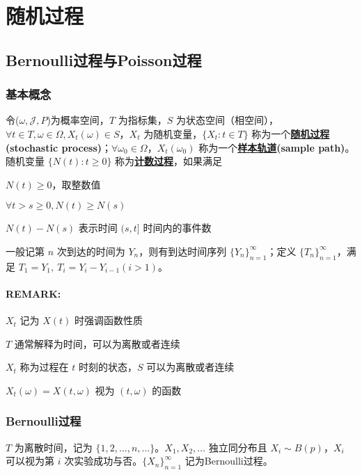 \documentclass[./main.tex]{subfiles}
\begin{document}
\chapter{随机过程}
\section{Bernoulli过程与Poisson过程}
\subsection{基本概念}
令($\omega,\mathscr{J},P$)为概率空间，$T$ 为指标集，$S$ 为状态空间（相空间），$\forall t\in T, \omega\in\Omega,X_t(\omega)\in S$，$X_t$ 为随机变量，$\{X_t:t\in T\}$ 称为一个\underline{\textbf{随机过程}}\textbf{(stochastic process)}；$\forall \omega_0\in\Omega$，$X_t(\omega_0)$ 称为一个\underline{\textbf{样本轨道}}\textbf{(sample path)}。\\
随机变量 $\{N(t):t\ge 0\}$ 称为\underline{\textbf{计数过程}}，如果满足
\begin{enumerate*}
    \item $N(t)\ge 0$，取整数值
    \item $\forall t>s\ge 0,N(t)\ge N(s)$
    \item $N(t)-N(s)$ 表示时间 $(s,t]$ 时间内的事件数
\end{enumerate*}

一般记第 $n$ 次到达的时间为 $Y_n$，则有到达时间序列 $\{Y_n\}_{n=1}^{\infty}$；定义 $\{T_n\}_{n=1}^{\infty}$，满足 $T_1=Y_1,\ T_i=Y_i-Y_{i-1}(i>1)$。
\subsubsection{REMARK:}
\begin{enumerate*}
    \item $X_t$ 记为 $X(t)$ 时强调函数性质
    \item $T$ 通常解释为时间，可以为离散或者连续
    \item $X_t$ 称为过程在 $t$ 时刻的状态，$S$ 可以为离散或者连续
    \item $X_t(\omega)=X(t,\omega)$ 视为 $(t,\omega)$ 的函数
\end{enumerate*}
\subsection{Bernoulli过程}
$T$ 为离散时间，记为 $\{1,2,\dots,n,\dots\}$。$X_1,X_2,\dots$ 独立同分布且 $X_i\sim B(p)$，$X_i$ 可以视为第 $i$ 次实验成功与否。$\{X_n\}_{n=1}^{\infty}$ 记为Bernoulli过程。
\end{document}
